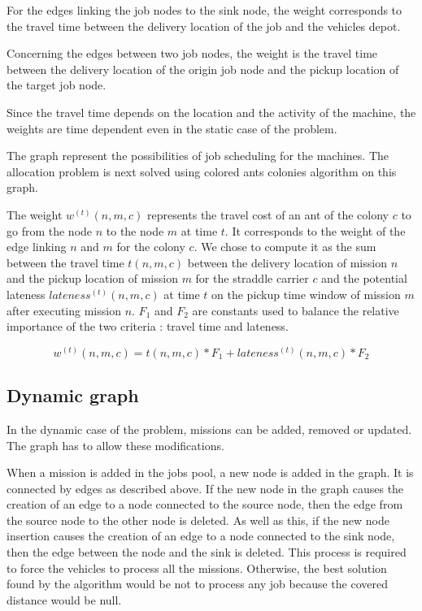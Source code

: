 \documentclass[a4paper,10pt]{article}
\begin{document}
For the edges linking the job nodes to the sink node, the weight corresponds to the travel time between the delivery location of the job and the vehicles depot.

Concerning the edges between two job nodes, the weight is the travel time between the delivery location of the origin job node and the pickup location of the target job node.

Since the travel time depends on the location and the activity of the machine, the weights are time dependent even in the static case of the problem.

The graph represent the possibilities of job scheduling for the machines. The allocation problem is next solved using colored ants colonies algorithm on this graph.

The weight $w^{(t)}(n,m,c)$ represents the travel cost of an ant of the colony $c$ to go from the node $n$ to the node $m$ at time $t$. It corresponds to the weight of the edge linking $n$ and $m$ for the colony $c$. We chose to compute it as the sum between the travel time $t(n,m,c)$ between the delivery location of mission $n$ and the pickup location of mission $m$ for the straddle carrier $c$ and the potential lateness $lateness^{(t)}(n,m,c)$ at time $t$ on the pickup time window of mission $m$ after executing mission $n$. $F_1$ and $F_2$ are constants used to balance the relative importance of the two criteria : travel time and lateness.

\begin{equation*}
  w^{(t)}(n,m,c) = t(n,m,c)*F_1 + lateness^{(t)}(n,m,c)*F_2
\end{equation*}

\subsection{Dynamic graph}
In the dynamic case of the problem, missions can be added, removed or updated. The graph has to allow these modifications.

When a mission is added in the jobs pool, a new node is added in the graph. It is connected by edges as described above. If the new node in the graph causes the creation of an edge to a node connected to the source node, then the edge from the source node to the other node is deleted. As well as this, if the new node insertion causes the creation of an edge to a node connected to the sink node, then the edge between the node and the sink is deleted. This process is required to force the vehicles to process all the missions. Otherwise, the best solution found by the algorithm would be not to process any job because the covered distance would be null.
\end{document}
